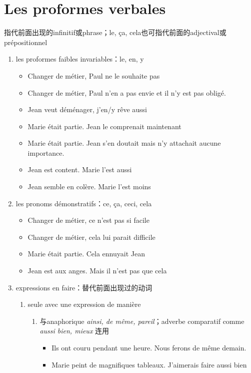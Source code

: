 \documentclass[UTF8]{report}
\begin{document}
\section{Les proformes verbales}
指代前面出现的infinitif或phrase；le, ça, cela也可指代前面的adjectival或prépositionnel
\begin{enumerate}
    \item les proformes faibles invariables：le, en, y
    \begin{itemize}
        \item Changer de métier, Paul ne le souhaite pas
        \item Changer de métier, Paul n’en a pas envie et il n’y est pas obligé.
        \item Jean veut déménager, j’en/y rêve aussi
        \item Marie était partie. Jean le comprenait maintenant
        \item Marie était partie. Jean s’en doutait mais n’y attachait aucune importance.
        \item Jean est content. Marie l’est aussi
        \item Jean semble en colère. Marie l’est moins
    \end{itemize}
    \item les pronoms démonstratifs：ce, ça, ceci, cela
    \begin{itemize}
        \item Changer de métier, ce n’est pas si facile
        \item Changer de métier, cela lui parait difficile
        \item Marie était partie. Cela ennuyait Jean
        \item Jean est aux anges. Mais il n’est pas que cela
    \end{itemize}
    \item expressions en faire：替代前面出现过的动词
    \begin{enumerate}
        \item seule avec une expression de manière
        \begin{enumerate}
            \item 与anaphorique \textit{ainsi, de même, pareil}；adverbe comparatif comme \textit{aussi bien, mieux} 连用
            \begin{itemize}
            \item Ils ont couru pendant une heure. Nous ferons de même demain.
            \item Marie peint de magnifiques tableaux. J’aimerais faire aussi bien

\end{itemize}
\end{enumerate}
\end{enumerate}
\end{enumerate}
\end{document}
